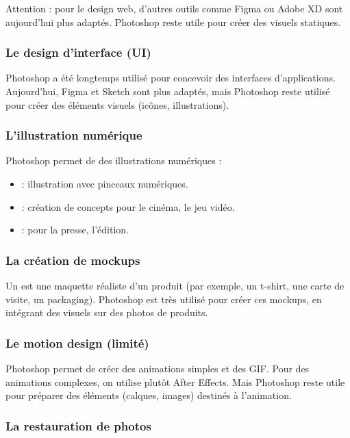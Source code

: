 Attention : pour le design web, d'autres outils comme Figma ou Adobe XD sont aujourd'hui plus adaptés. Photoshop reste utile pour créer des visuels statiques.

\subsubsection{Le design d'interface (UI)}

Photoshop a été longtemps utilisé pour concevoir des interfaces d'applications. Aujourd'hui, Figma et Sketch sont plus adaptés, mais Photoshop reste utilisé pour créer des éléments visuels (icônes, illustrations).

\subsubsection{L'illustration numérique}

Photoshop permet de  des illustrations numériques :

\begin{itemize}
    \item {} : illustration avec pinceaux numériques.
    \item {} : création de concepts pour le cinéma, le jeu vidéo.
    \item {} : pour la presse, l'édition.
\end{itemize}

\subsubsection{La création de mockups}

Un  est une maquette réaliste d'un produit (par exemple, un t-shirt, une carte de visite, un packaging). Photoshop est très utilisé pour créer ces mockups, en intégrant des visuels sur des photos de produits.

\subsubsection{Le motion design (limité)}

Photoshop permet de créer des animations simples et des GIF. Pour des animations complexes, on utilise plutôt After Effects. Mais Photoshop reste utile pour préparer des éléments (calques, images) destinés à l'animation.

\subsubsection{La restauration de photos}

